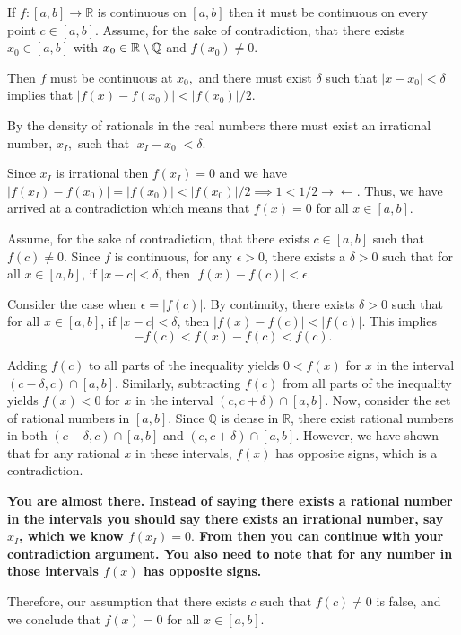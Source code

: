 \documentclass{report}
\begin{document}
\pagebreak
{}
\begin{myproof}
    

If $f:[a, b] \rightarrow \mathbb{R}$ is continuous on $[a, b]$ then it must be continuous on every point $c \in [a,b].$ Assume, for the sake of contradiction, that there exists $x_0 \in [a,b]$ with $x_0 \in \RR \setminus \QQ$ and $f(x_0) \not =0.$

Then $f$ must be continuous at $x_0,$ and there must exist $\delta$ such that $|x-x_0| < \delta$ implies that $|f(x) - f(x_0)| < |f(x_0)|/2.$ 

By the density of rationals in the real numbers there must exist an irrational number, $x_I,$ such that $|x_I - x_0| < \delta.$ 

Since $x_I$ is irrational then $f(x_I) = 0$ and we have $|f(x_I) - f(x_0)| =  |f(x_0)| < \left|f(x_0)\right|/2 \implies 1 < 1/2 \rightarrow\!\leftarrow.$  Thus, we have arrived at a contradiction which means that $f(x)=0$ for all $x \in[a, b].$

\end{myproof}


Assume, for the sake of contradiction, that there exists $c \in[a, b]$ such that $f(c) \neq 0$. Since $f$ is continuous, for any $\epsilon>0$, there exists a $\delta>0$ such that for all $x \in[a, b]$, if $|x-c|<\delta$, then $|f(x)-f(c)|<\epsilon$.

Consider the case when $\epsilon=|f(c)|$. By continuity, there exists $\delta>0$ such that for all $x \in[a, b]$, if $|x-c|<\delta$, then $|f(x)-f(c)|<|f(c)|$. This implies
$$
-f(c)<f(x)-f(c)<f(c) .
$$

Adding $f(c)$ to all parts of the inequality yields $0<f(x)$ for $x$ in the interval $(c-\delta, c) \cap[a, b]$. Similarly, subtracting $f(c)$ from all parts of the inequality yields $f(x)<0$ for $x$ in the interval $(c, c+\delta) \cap[a, b]$. Now, consider the set of rational numbers in $[a, b]$. Since $\mathbb{Q}$ is dense in $\mathbb{R}$, there exist rational numbers in both $(c-\delta, c) \cap[a, b]$ and $(c, c+\delta) \cap[a, b]$. However, we have shown that for any rational $x$ in these intervals, $f(x)$ has opposite signs, which is a contradiction.

\textbf{You are almost there. Instead of saying there exists a rational number in the intervals you should say there exists an irrational number, say $x_I$, which we know $f(x_I)=0.$ From then you can continue with your contradiction argument. You also need to note that for any number in those intervals $f(x)$ has opposite signs.}

Therefore, our assumption that there exists $c$ such that $f(c) \neq 0$ is false, and we conclude that $f(x)=0$ for all $x \in[a, b]$.
\end{document}
